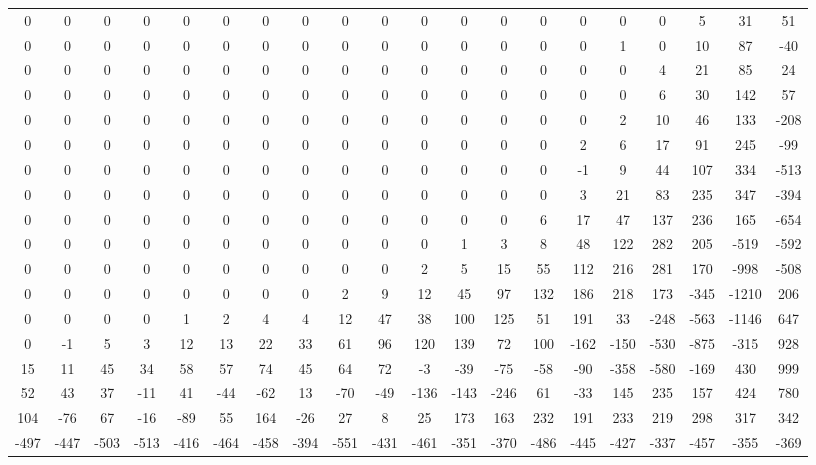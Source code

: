  \begin{tabular}{ | * {20}{c} | } 
0 & 0 & 0 & 0 & 0 & 0 & 0 & 0 & 0 & 0 & 0 & 0 & 0 & 0 & 0 & 0 & 0 & 5 & 31 & 51 \\ 
0 & 0 & 0 & 0 & 0 & 0 & 0 & 0 & 0 & 0 & 0 & 0 & 0 & 0 & 0 & 1 & 0 & 10 & 87 & -40 \\ 
0 & 0 & 0 & 0 & 0 & 0 & 0 & 0 & 0 & 0 & 0 & 0 & 0 & 0 & 0 & 0 & 4 & 21 & 85 & 24 \\ 
0 & 0 & 0 & 0 & 0 & 0 & 0 & 0 & 0 & 0 & 0 & 0 & 0 & 0 & 0 & 0 & 6 & 30 & 142 & 57 \\ 
0 & 0 & 0 & 0 & 0 & 0 & 0 & 0 & 0 & 0 & 0 & 0 & 0 & 0 & 0 & 2 & 10 & 46 & 133 & -208 \\ 
0 & 0 & 0 & 0 & 0 & 0 & 0 & 0 & 0 & 0 & 0 & 0 & 0 & 0 & 2 & 6 & 17 & 91 & 245 & -99 \\ 
0 & 0 & 0 & 0 & 0 & 0 & 0 & 0 & 0 & 0 & 0 & 0 & 0 & 0 & -1 & 9 & 44 & 107 & 334 & -513 \\ 
0 & 0 & 0 & 0 & 0 & 0 & 0 & 0 & 0 & 0 & 0 & 0 & 0 & 0 & 3 & 21 & 83 & 235 & 347 & -394 \\ 
0 & 0 & 0 & 0 & 0 & 0 & 0 & 0 & 0 & 0 & 0 & 0 & 0 & 6 & 17 & 47 & 137 & 236 & 165 & -654 \\ 
0 & 0 & 0 & 0 & 0 & 0 & 0 & 0 & 0 & 0 & 0 & 1 & 3 & 8 & 48 & 122 & 282 & 205 & -519 & -592 \\ 
0 & 0 & 0 & 0 & 0 & 0 & 0 & 0 & 0 & 0 & 2 & 5 & 15 & 55 & 112 & 216 & 281 & 170 & -998 & -508 \\ 
0 & 0 & 0 & 0 & 0 & 0 & 0 & 0 & 2 & 9 & 12 & 45 & 97 & 132 & 186 & 218 & 173 & -345 & -1210 & 206 \\ 
0 & 0 & 0 & 0 & 1 & 2 & 4 & 4 & 12 & 47 & 38 & 100 & 125 & 51 & 191 & 33 & -248 & -563 & -1146 & 647 \\ 
0 & -1 & 5 & 3 & 12 & 13 & 22 & 33 & 61 & 96 & 120 & 139 & 72 & 100 & -162 & -150 & -530 & -875 & -315 & 928 \\ 
15 & 11 & 45 & 34 & 58 & 57 & 74 & 45 & 64 & 72 & -3 & -39 & -75 & -58 & -90 & -358 & -580 & -169 & 430 & 999 \\ 
52 & 43 & 37 & -11 & 41 & -44 & -62 & 13 & -70 & -49 & -136 & -143 & -246 & 61 & -33 & 145 & 235 & 157 & 424 & 780 \\ 
104 & -76 & 67 & -16 & -89 & 55 & 164 & -26 & 27 & 8 & 25 & 173 & 163 & 232 & 191 & 233 & 219 & 298 & 317 & 342 \\ 
-497 & -447 & -503 & -513 & -416 & -464 & -458 & -394 & -551 & -431 & -461 & -351 & -370 & -486 & -445 & -427 & -337 & -457 & -355 & -369 \\ 
 \end{tabular} 
